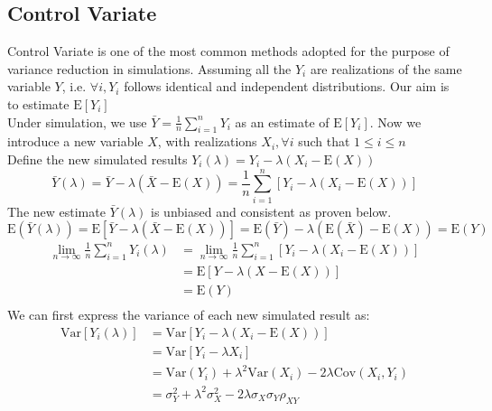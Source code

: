 \subsection{Control Variate}
Control Variate is one of the most common methods adopted for the purpose of variance reduction in simulations. Assuming all the $Y_{i}$ are realizations of the same variable $Y$, i.e. $\forall  i, Y_{i}$ follows identical and independent distributions. Our aim is to estimate $\mathrm{E}[Y_{i}]$ \\
Under simulation, we use $\bar{Y} = \frac{1}{n} \sum_{i=1}^{n} Y_{i}$ as an estimate of $\mathrm{E}[Y_{i}]$.
Now we introduce a new variable $X$, with realizations $X_{i}, \forall i $ such that $1 \leq i \leq n$\\
Define the new simulated results $Y_{i}(\lambda) = Y_{i} - \lambda (X_{i} - \mathrm{E}(X))$
$$\bar{Y}(\lambda) = \bar{Y} - \lambda (\bar{X} - \mathrm{E}(X)) = \frac{1}{n} \sum_{i=1}^{n} [Y_{i} - \lambda (X_{i} - \mathrm{E}(X))]$$
The new estimate $\bar{Y}(\lambda)$ is unbiased and consistent as proven below.\\
$$\mathrm{E}(\bar{Y}(\lambda)) = \mathrm{E}[\bar{Y} - \lambda(\bar{X} - \mathrm{E}(X))] = \mathrm{E}(\bar{Y}) - \lambda(\mathrm{E}(\bar{X}) - \mathrm{E}(X)) = \mathrm{E}(Y) $$
\begin{equation*}
\begin{split}
\lim_{n\to\infty} \frac{1}{n}\sum_{i=1}^{n} Y_{i}(\lambda) 
&=\lim_{n\to\infty} \frac{1}{n}\sum_{i=1}^{n} [Y_{i} - \lambda (X_{i} - \mathrm{E}(X))] \\
&= \mathrm{E}[Y - \lambda(X-\mathrm{E}(X))] \\
&= \mathrm{E}(Y) \\
\end{split}
\end{equation*}
We can first express the variance of each new simulated result as:
\begin{equation*}
\begin{split}
\mathrm{Var}[Y_{i}(\lambda)]
&=\mathrm{Var} [Y_{i} - \lambda(X_{i} - \mathrm{E}(X))] \\
&= \mathrm{Var}[Y_{i} - \lambda X_{i}] \\
&= \mathrm{Var}(Y_{i}) + \lambda^{2}\mathrm{Var}(X_{i}) - 2\lambda\mathrm{Cov}(X_{i}, Y_{i}) \\
&= \sigma_{Y}^{2} + \lambda^{2}\sigma_{X}^{2}-2\lambda\sigma_{X}\sigma_{Y}\rho_{XY}\\
\end{split}
\end{equation*}
